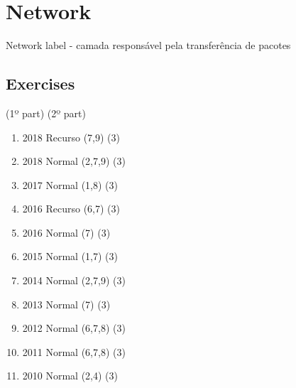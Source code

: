 \documentclass[../resumosRCOM.tex]{subfiles}
\begin{document}
\maketitle

\section{Network}
Network label - camada responsável pela transferência de pacotes

\subsection{Exercises}
(1º part) (2º part)
\begin{enumerate}
    \item 2018 Recurso (7,9) (3)
    \item 2018 Normal (2,7,9) (3)
    \item 2017 Normal (1,8) (3)
    \item 2016 Recurso (6,7) (3)
    \item 2016 Normal (7) (3)
    \item 2015 Normal (1,7) (3)
    \item 2014 Normal (2,7,9) (3)
    \item 2013 Normal (7) (3)
    \item 2012 Normal (6,7,8) (3)
    \item 2011 Normal (6,7,8) (3)
    \item 2010 Normal (2,4) (3)
\end{enumerate}
\end{document}
